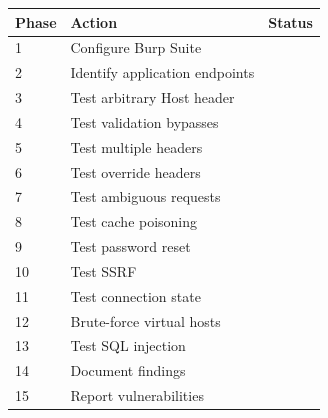 \documentclass[12pt,a4paper]{article}
\begin{document}
\begin{longtable}{|p{2cm}|p{8cm}|p{2cm}|}
    \hline
    \textbf{Phase} & \textbf{Action} & \textbf{Status} \\
    \hline
    1 & Configure Burp Suite & \\
    \hline
    2 & Identify application endpoints & \\
    \hline
    3 & Test arbitrary Host header & \\
    \hline
    4 & Test validation bypasses & \\
    \hline
    5 & Test multiple headers & \\
    \hline
    6 & Test override headers & \\
    \hline
    7 & Test ambiguous requests & \\
    \hline
    8 & Test cache poisoning & \\
    \hline
    9 & Test password reset & \\
    \hline
    10 & Test SSRF & \\
    \hline
    11 & Test connection state & \\
    \hline
    12 & Brute-force virtual hosts & \\
    \hline
    13 & Test SQL injection & \\
    \hline
    14 & Document findings & \\
    \hline
    15 & Report vulnerabilities & \\
    \hline
\end{longtable}

\end{document}
